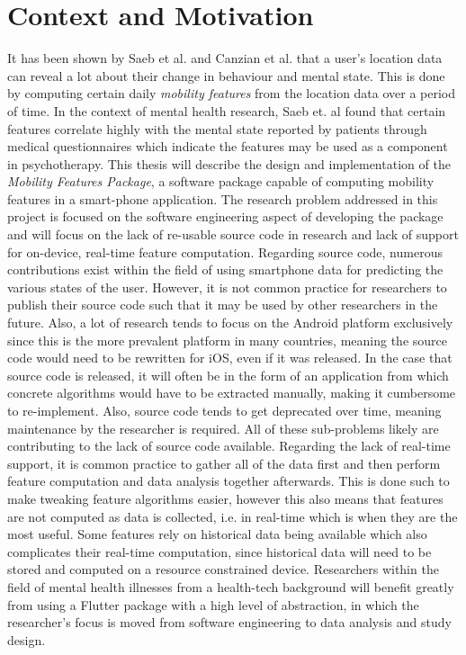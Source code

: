 \section{Context and Motivation}



It has been shown by Saeb et al. and Canzian et al. \cite{Saeb2015, Canzian2015} that a user's location data can reveal a lot about their change in behaviour and mental state. This is done by computing certain daily \textit{mobility features} from the location data over a period of time. In the context of mental health research, Saeb et. al \cite{Saeb2015} found that certain features correlate highly with the mental state reported by patients through medical questionnaires which indicate the features may be used as a component in psychotherapy. This thesis will describe the design and implementation of the \textit{Mobility Features Package}, a software package capable of computing mobility features in a smart-phone application. The research problem addressed in this project is focused on the software engineering aspect of developing the package and will focus on the lack of re-usable source code in research and lack of support for on-device, real-time feature computation. Regarding source code, numerous contributions exist within the field of using smartphone data for predicting the various states of the user. However, it is not common practice for researchers to publish their source code such that it may be used by other researchers in the future. Also, a lot of research tends to focus on the Android platform exclusively since this is the more prevalent platform in many countries, meaning the source code would need to be rewritten for iOS, even if it was released. In the case that source code is released, it will often be in the form of an application from which concrete algorithms would have to be extracted manually, making it cumbersome to re-implement. Also, source code tends to get deprecated over time, meaning maintenance by the researcher is required. All of these sub-problems likely are contributing to the lack of source code available. Regarding the lack of real-time support, it is common practice to gather all of the data first and then perform feature computation and data analysis together afterwards. This is done such to make tweaking feature algorithms easier, however this also means that features are not computed as data is collected, i.e. in real-time which is when they are the most useful. Some features rely on historical data being available which also complicates their real-time computation, since historical data will need to be stored and computed on a resource constrained device. Researchers within the field of mental health illnesses from a health-tech background will benefit greatly from using a Flutter package with a high level of abstraction, in which the researcher's focus is moved from software engineering to data analysis and study design. 